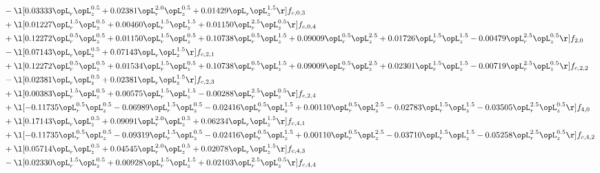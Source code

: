 \begin{alignat}{2}
& - \l[  0.03333 \opL_r \opL_z^{0.5} +  0.02381 \opL_r^{2.0} \opL_z^{0.5} +  0.01429 \opL_r \opL_z^{1.5}  \r] f_{c,0,3} \nonumber \\ 
& + \l[  0.01227 \opL_r^{1.5} \opL_z^{0.5} +  0.00460 \opL_r^{1.5} \opL_z^{1.5} +  0.01150 \opL_r^{2.5} \opL_z^{0.5}  \r] f_{c,0,4} \nonumber \\ 
& + \l[  0.12272 \opL_r^{0.5} \opL_z^{0.5} +  0.01150 \opL_r^{1.5} \opL_z^{0.5} +  0.10738 \opL_r^{0.5} \opL_z^{1.5} +  0.09009 \opL_r^{0.5} \opL_z^{2.5} +  0.01726 \opL_r^{1.5} \opL_z^{1.5}   -0.00479 \opL_r^{2.5} \opL_z^{0.5}  \r] f_{2,0} \nonumber \\ 
& - \l[  0.07143 \opL_r \opL_z^{0.5} +  0.07143 \opL_r \opL_z^{1.5}  \r] f_{c,2,1} \nonumber \\ 
& + \l[  0.12272 \opL_r^{0.5} \opL_z^{0.5} +  0.01534 \opL_r^{1.5} \opL_z^{0.5} +  0.10738 \opL_r^{0.5} \opL_z^{1.5} +  0.09009 \opL_r^{0.5} \opL_z^{2.5} +  0.02301 \opL_r^{1.5} \opL_z^{1.5}   -0.00719 \opL_r^{2.5} \opL_z^{0.5}  \r] f_{c,2,2} \nonumber \\ 
& - \l[  0.02381 \opL_r \opL_z^{0.5} +  0.02381 \opL_r \opL_z^{1.5}  \r] f_{c,2,3} \nonumber \\ 
& + \l[  0.00383 \opL_r^{1.5} \opL_z^{0.5} +  0.00575 \opL_r^{1.5} \opL_z^{1.5}   -0.00288 \opL_r^{2.5} \opL_z^{0.5}  \r] f_{c,2,4} \nonumber \\ 
& + \l[  -0.11735 \opL_r^{0.5} \opL_z^{0.5}   -0.06989 \opL_r^{1.5} \opL_z^{0.5}   -0.02416 \opL_r^{0.5} \opL_z^{1.5} +  0.00110 \opL_r^{0.5} \opL_z^{2.5}   -0.02783 \opL_r^{1.5} \opL_z^{1.5}   -0.03505 \opL_r^{2.5} \opL_z^{0.5}  \r] f_{4,0} \nonumber \\ 
& + \l[  0.17143 \opL_r \opL_z^{0.5} +  0.09091 \opL_r^{2.0} \opL_z^{0.5} +  0.06234 \opL_r \opL_z^{1.5}  \r] f_{c,4,1} \nonumber \\ 
& + \l[  -0.11735 \opL_r^{0.5} \opL_z^{0.5}   -0.09319 \opL_r^{1.5} \opL_z^{0.5}   -0.02416 \opL_r^{0.5} \opL_z^{1.5} +  0.00110 \opL_r^{0.5} \opL_z^{2.5}   -0.03710 \opL_r^{1.5} \opL_z^{1.5}   -0.05258 \opL_r^{2.5} \opL_z^{0.5}  \r] f_{c,4,2} \nonumber \\ 
& + \l[  0.05714 \opL_r \opL_z^{0.5} +  0.04545 \opL_r^{2.0} \opL_z^{0.5} +  0.02078 \opL_r \opL_z^{1.5}  \r] f_{c,4,3} \nonumber \\ 
& - \l[  0.02330 \opL_r^{1.5} \opL_z^{0.5} +  0.00928 \opL_r^{1.5} \opL_z^{1.5} +  0.02103 \opL_r^{2.5} \opL_z^{0.5}  \r] f_{c,4,4} \nonumber \\ 
\end{alignat} 


